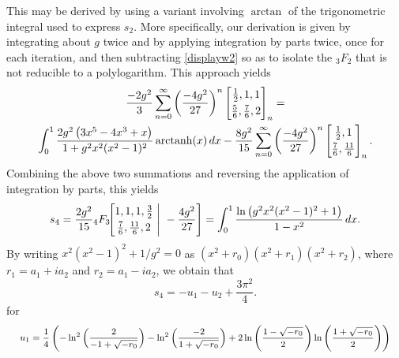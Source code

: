 \documentclass[12pt]{article}
\begin{document}
 This may be derived by using a variant involving $\operatorname{arctan}$ of the trigonometric integral used to express $s_{2}$. 
 More specifically, our derivation is given by integrating about $g$ twice and by applying integration by parts twice, once for each 
 iteration, and then subtracting \eqref{displayw2} so as to isolate the ${}_{3}F_{2}$ that is not reducible to a polylogarithm. This 
 approach yields 
\begin{multline*}
 \frac{-2g^2}{3} \sum_{n=0}^{\infty} \left( \frac{-4g^2}{27} \right)^{n} \left[ \begin{matrix} \frac{1}{2}, 1, 1 
 \vspace{1mm} \\ 
 \frac{5}{6}, \frac{7}{6}, 2 \end{matrix} \right]_{n} = \\ 
 \int_{0}^{1} \frac{2g^2 \left(3x^5 - 4x^3 + 
 x\right)}{1 + g^2x^2(x^2-1)^2} \, \text{arctanh}(x)\, dx - 
 \frac{8g^2}{15} \sum_{n = 
 0}^{\infty} \left( \frac{-4g^2}{27} \right)^{n} 
 \left[ \begin{matrix} \frac{1}{2}, 1 
 \vspace{1mm} \\ 
 \frac{7}{6}, \frac{11}{6} \end{matrix} \right]_{n}. 
\end{multline*}
 Combining the above two summations and reversing the application of integration by parts, this yields 
\begin{equation*}
 s_4=\frac{2g^2}{15} 
 {}_{4}F_{3}\!\!\left[ \begin{matrix} 
 1, 1, 1, \frac{3}{2} \vspace{1mm}\\ 
 \frac{7}{6}, \frac{11}{6}, 2 \end{matrix} \ \Bigg| \ -\frac{4g^2}{27} \right] 
 = \int_{0}^{1} \frac{\ln\left(g^2 x^2 (x^2 - 1)^2 + 1\right)}{1 - x^2} \, dx. 
\end{equation*}
 By writing $x^2 (x^2 - 1)^2 + 1/g^2=0$ as $(x^2+r_0)(x^2+r_1)(x^2+r_2)$, 
 where $r_1=a_1+ia_2$ and $r_2=a_1-ia_2$, we obtain that 
\begin{equation*}
 s_4 = -u_1-u_2 + \frac{3\pi^{2}}{4}. 
\end{equation*}
 for 
\begin{equation*}
 \text{ { \footnotesize $ u_1=\frac{1}{4} \left( - \ln^2\left(\frac{2}{-1 + \sqrt{-r_0}}\right) 
 - \ln^2\left(\frac{-2}{1 + \sqrt{-r_0}}\right) + 2 \ln\left(\frac{1 - \sqrt{-r_0}}{2} \right) 
 \ln\left(\frac{1 + \sqrt{-r_0}}{2}\right) \right) $ } } 
\end{equation*}
\end{document}
